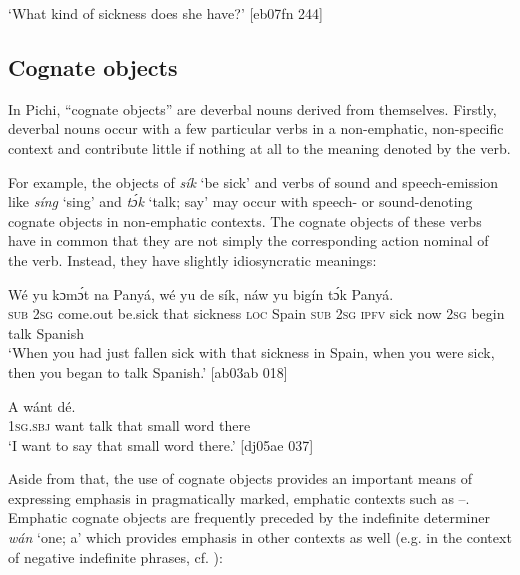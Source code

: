 \glt ‘What kind of sickness does she have?’ [eb07fn 244]
\z

\subsection{Cognate objects}\label{sec:9.3.3}

In Pichi, “cognate objects” \citep{Baron1971} are deverbal nouns derived from themselves. Firstly, deverbal nouns occur with a few particular verbs in a non-emphatic, non-specific context and contribute little if nothing at all to the meaning denoted by the verb. 


For example, the objects of \textit{sík} ‘be sick’ and verbs of sound and speech-emission like \textit{síng} ‘sing’ and \textit{tɔ́k} ‘talk; say’ may occur with speech- or sound-denoting cognate objects in non-emphatic contexts. The cognate objects of these verbs have in common that they are not simply the corresponding action nominal of the verb. Instead, they have slightly idiosyncratic meanings: 



\ea%
    \label{ex:key:1193}
    \gll Wé  yu  kɔmɔ́t              na  Panyá,  wé  yu  de  sík,
náw    yu  bigín  tɔ́k  Panyá.\\
\textsc{sub}  \textsc{2sg}  come.out  be.sick  that  sickness  \textsc{loc}  Spain  \textsc{sub}  \textsc{2sg}  \textsc{ipfv}  sick
now    \textsc{2sg}  begin  talk  Spanish\\

\glt ‘When you had just fallen sick with that sickness in Spain, when you were sick, 
then you began to talk Spanish.’ [ab03ab 018]
\z


\ea%
    \label{ex:key:1194}
    \gll A    wánt            dé.\\
\textsc{1sg.sbj}  want  talk  that  small  word  there\\

\glt ‘I want to say that small word there.’ [dj05ae 037]
\z

Aside from that, the use of cognate objects provides an important means of expressing emphasis in pragmatically marked, emphatic contexts such as –. Emphatic cognate objects are frequently preceded by the indefinite determiner \textit{wán} ‘one; a’ which provides emphasis in other contexts as well (e.g. in the context of negative indefinite phrases, cf. ):


